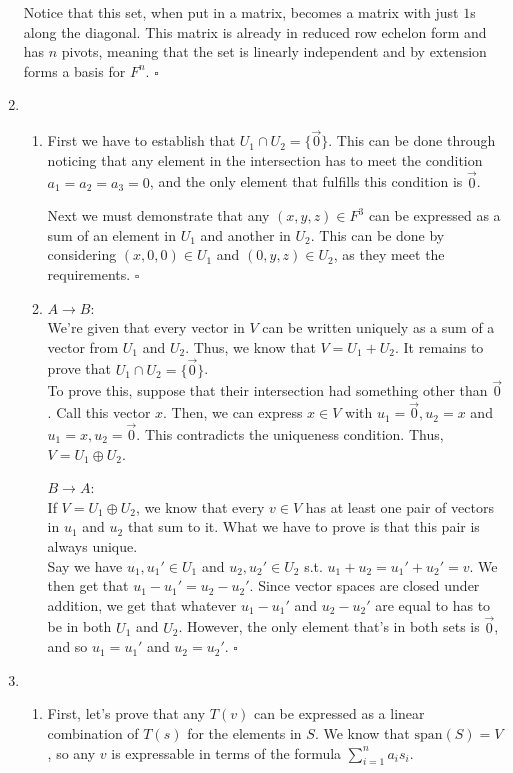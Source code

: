 \documentclass[12pt]{article}
\begin{document}
\begin{enumerate}
            Notice that this set, when put in a matrix, becomes a matrix with just $1$s along the diagonal.
            This matrix is already in reduced row echelon form and has $n$ pivots, meaning that the set
            is linearly independent and by extension forms a basis for $F^n$. $\square$
      \item \begin{enumerate}
                  \item First we have to establish that $U_1 \cap U_2=\{\vec{0}\}$.
                        This can be done through noticing that any element in the intersection has to meet the condition $a_1=a_2=a_3=0$,
                        and the only element that fulfills this condition is $\vec{0}$.

                        Next we must demonstrate that any $(x,y,z) \in F^3$ can be expressed as a sum of an element in $U_1$ and another in $U_2$.
                        This can be done by considering $(x,0,0) \in U_1$ and $(0,y,z) \in U_2$, as they meet the requirements. $\square$
                  \item $A \rightarrow B$: \\
                        We're given that every vector in $V$ can be written uniquely as a sum of a vector from $U_1$ and $U_2$.
                        Thus, we know that $V=U_1+U_2$.
                        It remains to prove that $U_1 \cap U_2=\{\vec{0}\}$. \\
                        To prove this, suppose that their intersection had something other than $\vec{0}$.
                        Call this vector $x$.
                        Then, we can express $x \in V$ with $u_1=\vec{0}, u_2=x$ and $u_1=x, u_2=\vec{0}$.
                        This contradicts the uniqueness condition.
                        Thus, $V=U_1 \oplus U_2$.

                        $B \rightarrow A$: \\
                        If $V=U_1 \oplus U_2$, we know that every $v \in V$ has at least one pair of vectors in $u_1$ and $u_2$ that sum to it.
                        What we have to prove is that this pair is always unique. \\
                        Say we have $u_1, u_1' \in U_1$ and $u_2, u_2' \in U_2$ s.t. $u_1+u_2=u_1'+u_2'=v$.
                        We then get that $u_1-u_1'=u_2-u_2'$.
                        Since vector spaces are closed under addition, we get that
                        whatever $u_1-u_1'$ and $u_2-u_2'$ are equal to has to be in both $U_1$ and $U_2$.
                        However, the only element that's in both sets is $\vec{0}$, and so $u_1=u_1'$
                        and $u_2=u_2'$. $\square$
            \end{enumerate}
      \item \begin{enumerate}
                  \item First, let's prove that any $T(v)$ can be expressed as a linear combination of $T(s)$ for the elements in $S$.
                        We know that $\text{span}(S)=V$, so any $v$ is expressable in terms of the formula $\sum_{i=1}^n a_i s_i$.


\end{enumerate}
\end{enumerate}
\end{document}
